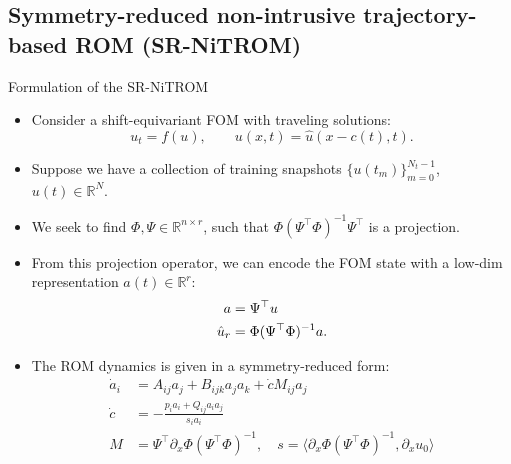 \documentclass[presentation]{beamer}
\begin{document}
\subsection{Symmetry-reduced non-intrusive trajectory-based ROM (SR-NiTROM)}
\label{sec:org6c4f9ae}
\begin{frame}[label={sec:orgd436b07}]{Formulation of the SR-NiTROM}
\begin{itemize}[<+->]
\item Consider a shift-equivariant FOM with traveling solutions:
\begin{equation}
   \label{eq:1}
   u_{t} = f(u), \qquad u(x, t) = \hat{u}(x - c(t), t).
\end{equation}
\item Suppose we have a collection of training snapshots \(\{u(t_{m})\}_{m = 0}^{N_{t}-1}\), \(u(t)\in\mathbb{R}^{N}\).
\item We seek to find \(\Phi, \Psi\in\mathbb{R}^{n\times r}\), such that \(\Phi(\Psi^{\top}\Phi)^{-1}\Psi^{\top}\) is a projection.
\item From this projection operator, we can encode the FOM state with a low-dim representation \(a(t)\in\mathbb{R}^{r}\):
\begin{align}
  \label{eq:2}
    a &= \Psi^{\top}u \notag\\
    \hat{u}_{r} &= \Phi(\Psi^{\top}\Phi)^{-1}a.
\end{align}
\item The ROM dynamics is given in a symmetry-reduced form:
\begin{subequations}
  \label{eq:3}
  \begin{align}
    \label{eq:3a}
    \dot{a}_{i} &= A_{ij}a_{j} + B_{ijk}a_{j}a_{k} + \dot{c} M_{ij}a_{j}\\
    \label{eq:3b}
    \dot{c} &= -\frac{p_{i}a_{i} + Q_{ij}a_{i}a_{j}}{s_{i}a_{i}}\\
    \label{eq:3c}
    M &= \Psi^{\top}\partial_{x}\Phi(\Psi^{\top}\Phi)^{-1}, \quad s = \langle\partial_{x}\Phi(\Psi^{\top}\Phi)^{-1}, \partial_{x}u_{0}\rangle
  \end{align}
\end{subequations}
\end{itemize}
\end{frame}
\end{document}
